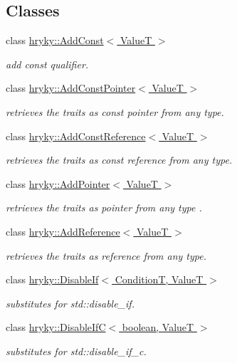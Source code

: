 \subsection*{Classes}
\begin{DoxyCompactItemize}
\item 
class \hyperlink{classhryky_1_1_add_const}{hryky\-::\-Add\-Const$<$ Value\-T $>$}
\begin{DoxyCompactList}\small\item\em add const qualifier. \end{DoxyCompactList}\item 
class \hyperlink{classhryky_1_1_add_const_pointer}{hryky\-::\-Add\-Const\-Pointer$<$ Value\-T $>$}
\begin{DoxyCompactList}\small\item\em retrieves the traits as const pointer from any type. \end{DoxyCompactList}\item 
class \hyperlink{classhryky_1_1_add_const_reference}{hryky\-::\-Add\-Const\-Reference$<$ Value\-T $>$}
\begin{DoxyCompactList}\small\item\em retrieves the traits as const reference from any type. \end{DoxyCompactList}\item 
class \hyperlink{classhryky_1_1_add_pointer}{hryky\-::\-Add\-Pointer$<$ Value\-T $>$}
\begin{DoxyCompactList}\small\item\em retrieves the traits as pointer from any type . \end{DoxyCompactList}\item 
class \hyperlink{classhryky_1_1_add_reference}{hryky\-::\-Add\-Reference$<$ Value\-T $>$}
\begin{DoxyCompactList}\small\item\em retrieves the traits as reference from any type. \end{DoxyCompactList}\item 
class \hyperlink{classhryky_1_1_disable_if}{hryky\-::\-Disable\-If$<$ Condition\-T, Value\-T $>$}
\begin{DoxyCompactList}\small\item\em substitutes for std\-::disable\-\_\-if. \end{DoxyCompactList}\item 
class \hyperlink{classhryky_1_1_disable_if_c}{hryky\-::\-Disable\-If\-C$<$ boolean, Value\-T $>$}
\begin{DoxyCompactList}\small\item\em substitutes for std\-::disable\-\_\-if\-\_\-c. \end{DoxyCompactList}\item 

\end{DoxyCompactItemize}
